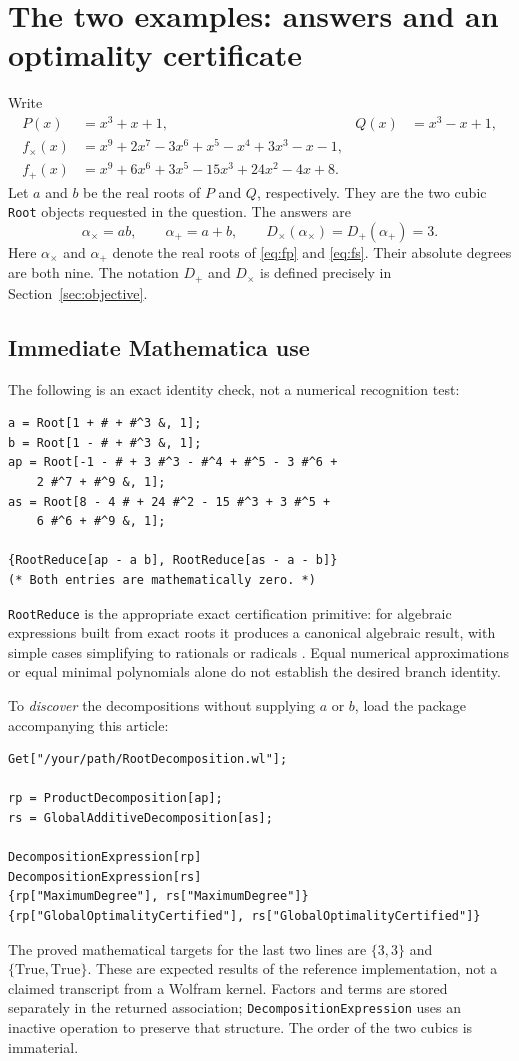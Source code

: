 \documentclass[11pt,letterpaper]{article}
\theoremstyle{definition}
\theoremstyle{remark}
\newcommand{\Dplus}{D_{+}}
\newcommand{\Dtimes}{D_{\times}}
\newcommand{\wl}[1]{\texttt{#1}}
\begin{document}
\section{The two examples: answers and an optimality certificate}
\label{sec:examples}
Write
\begin{align}
 P(x)&=x^3+x+1, & Q(x)&=x^3-x+1,\\
 f_\times(x)&=x^9+2x^7-3x^6+x^5-x^4+3x^3-x-1,\label{eq:fp}\\
 f_+(x)&=x^9+6x^6+3x^5-15x^3+24x^2-4x+8.\label{eq:fs}
\end{align}
Let \(a\) and \(b\) be the real roots of \(P\) and \(Q\), respectively.
They are the two cubic \wl{Root} objects requested in the question.
The answers are
\begin{equation}\boxed{\alpha_\times=ab,\qquad \alpha_+=a+b,\qquad
 \Dtimes(\alpha_\times)=\Dplus(\alpha_+)=3.}\label{eq:answers}\end{equation}
Here \(\alpha_\times\) and \(\alpha_+\) denote the real roots of
\eqref{eq:fp} and \eqref{eq:fs}. Their absolute degrees are both nine.
The notation \(D_+\) and \(D_\times\) is defined precisely in
Section~\ref{sec:objective}.

\subsection{Immediate Mathematica use}
The following is an exact identity check, not a numerical recognition test:
\begin{lstlisting}
a = Root[1 + # + #^3 &, 1];
b = Root[1 - # + #^3 &, 1];
ap = Root[-1 - # + 3 #^3 - #^4 + #^5 - 3 #^6 +
    2 #^7 + #^9 &, 1];
as = Root[8 - 4 # + 24 #^2 - 15 #^3 + 3 #^5 +
    6 #^6 + #^9 &, 1];

{RootReduce[ap - a b], RootReduce[as - a - b]}
(* Both entries are mathematically zero. *)
\end{lstlisting}
\wl{RootReduce} is the appropriate exact certification primitive: for
algebraic expressions built from exact roots it produces a canonical
algebraic result, with simple cases simplifying to rationals or radicals
\cite{rootreduce}. Equal numerical approximations or equal minimal
polynomials alone do not establish the desired branch identity.

To \emph{discover} the decompositions without supplying \(a\) or \(b\),
load the package accompanying this article:
\begin{lstlisting}
Get["/your/path/RootDecomposition.wl"];

rp = ProductDecomposition[ap];
rs = GlobalAdditiveDecomposition[as];

DecompositionExpression[rp]
DecompositionExpression[rs]
{rp["MaximumDegree"], rs["MaximumDegree"]}
{rp["GlobalOptimalityCertified"], rs["GlobalOptimalityCertified"]}
\end{lstlisting}
The proved mathematical targets for the last two lines are \(\{3,3\}\)
and \(\{\mathrm{True},\mathrm{True}\}\). These are expected results of
the reference implementation, not a claimed transcript from a Wolfram
kernel. Factors and terms are stored separately in the returned association;
\wl{DecompositionExpression} uses an inactive operation to preserve that
structure. The order of the two cubics is immaterial.
\end{document}
